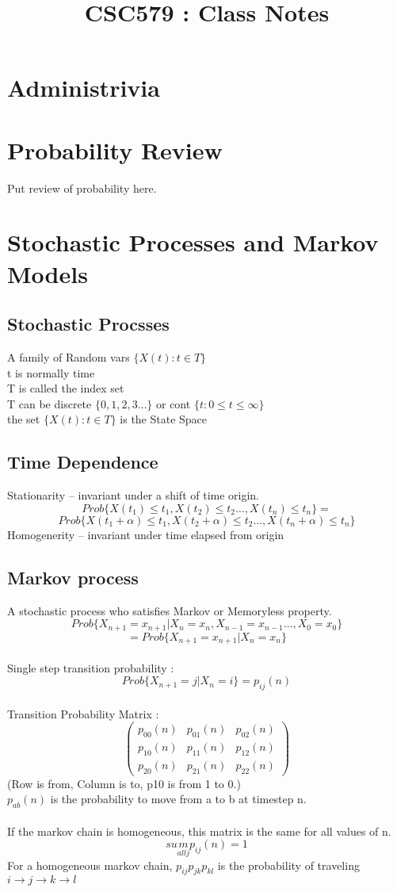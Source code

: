 \documentclass{article}
\begin{document}
\title{CSC579 : Class Notes}
\section {Administrivia}
\section{Probability Review}
Put review of probability here. 
\section{ Stochastic Processes and Markov Models }
	\subsection{Stochastic Procsses}
	  A family of Random vars $\{ X(t) : t\in T\}$ 
	\\\indent t is normally time  
    \\\indent T is called the index set 
    \\\indent T can be discrete $\{ 0,1,2,3 \ldots \}$ or cont $\{ t : 0 \le t \le \infty \}$
	\\\indent the set  $\{ X(t) : t \in T \}$ is the State Space 
	\\
	\subsection{Time Dependence}
	Stationarity -- invariant under a shift of time origin. 
	\[Prob\{ X(t_1) \le t_1, X(t_2) \le t_2 \ldots, X(t_n) \le t_n \} = \]
	\[Prob\{ X(t_1 + \alpha ) \le t_1, X(t_2 + \alpha ) \le t_2 \ldots, X(t_n +\alpha) \le t_n \}\]
	Homogenerity -- invariant under time elapsed from origin
	\\
	\subsection{Markov process}
	A stochastic process who satisfies Markov or Memoryless property. 
	\[Prob\{ X_{n+1} = x_{n+1} | X_n = x_n, X_{n-1} = x_{n-1} \ldots , X_0 = x_0 \}\]
	\[= Prob\{ X_{n+1} = x_{n+1} | X_n = x_n\}\]
	\\Single step transition probability :
	\[Prob\{X_{n+1} = j | X_n = i \} = p_{ij}(n) \]
	\\Transition Probability Matrix : 
	\[ \left( \begin{array}{ccc}
            p_{00}(n) & p_{01}(n) & p_{02}(n) \\
			p_{10}(n) & p_{11}(n) & p_{12}(n) \\
			p_{20}(n) & p_{21}(n) & p_{22}(n) 
	\end{array} \right)\] 
	(Row is from, Column is to, p10 is from 1 to 0.)
 	\\$p_{ab}(n)$ is the probability to move from a to b at timestep n.
	\\
 	\\If the markov chain is homogeneous, this matrix is the same for all values of n. 
	\[sum\limits_{all j}{p_{ij}(n)} = 1\]
	For a homogeneous markov chain, $p_{ij} p_{jk} p_{kl}$ is the probability of traveling $i\rightarrow j\rightarrow k\rightarrow l$
\end{document}
